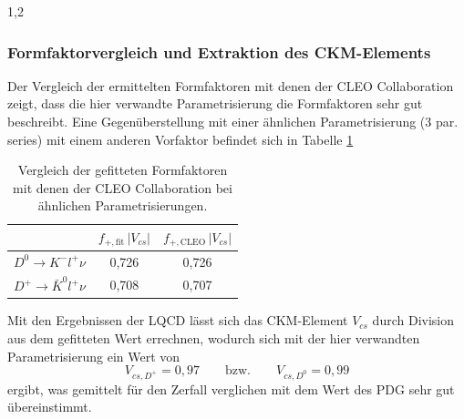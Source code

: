 \documentclass[11pt,a4paper,twoside]{report}
\begin{document}
\begin{spacing}{1,2}
\subsubsection*{Formfaktorvergleich und Extraktion des CKM-Elements}
Der Vergleich der ermittelten Formfaktoren mit denen der CLEO Collaboration \cite{PhysRev_Data} zeigt, dass die hier verwandte Parametrisierung die Formfaktoren
sehr gut beschreibt. Eine Gegenüberstellung mit einer ähnlichen Parametrisierung (3 par. series) mit einem anderen Vorfaktor befindet sich in Tabelle \ref{tab_formvergleich}
\begin{table}[h]
 \begin{tabular}{c|cc}
 \toprule
  & $f_{+,\text{fit}}\,|V_{cs}|$ & $f_{+,\text{CLEO}}\,|V_{cs}|$ \\
  \midrule
  $D^0 \rightarrow K^- l^+ \nu$ & 0,726 & 0,726 \\
  $D^+ \rightarrow \bar K^0 l^+ \nu$ & 0,708 & 0,707  \\
  \bottomrule\bottomrule
 \end{tabular}
\caption{Vergleich der gefitteten Formfaktoren mit denen der CLEO Collaboration bei ähnlichen Parametrisierungen.}
\label{tab_formvergleich}
\end{table}

\noindent
Mit den Ergebnissen der LQCD \cite{PhysRev_Data} lässt sich das CKM-Element $V_{cs}$ durch Division aus dem gefitteten Wert errechnen, wodurch sich mit der hier
verwandten Parametrisierung ein Wert von
\begin{equation}
 V_{cs,D^+} = 0,97 \qquad \text{bzw.} \qquad V_{cs,D^0} = 0,99
\end{equation}
ergibt, was gemittelt für den Zerfall verglichen mit dem Wert des PDG \cite{PDG} sehr gut übereinstimmt.


% 
% 
% 



\end{spacing}
\end{document}
